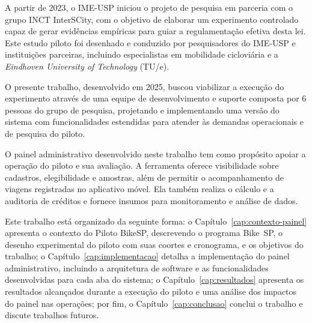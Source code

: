 A partir de 2023, o IME-USP iniciou o projeto de pesquisa em parceria com o
grupo INCT InterSCity, com o objetivo de elaborar um experimento controlado
capaz de gerar evidências empíricas para guiar a regulamentação efetiva desta
lei. Este estudo piloto foi desenhado e conduzido por pesquisadores do IME-USP
e instituições parceiras, incluindo especialistas em mobilidade cicloviária e a
\emph{Eindhoven University of Technology} (TU/e).

O presente trabalho, desenvolvido em 2025, buscou viabilizar a execução do
experimento através de uma equipe de desenvolvimento e
suporte composta por 6 pessoas do grupo de pesquisa, projetando e implementando
uma versão do sistema com funcionalidades estendidas para atender às
demandas operacionais e de pesquisa do piloto.

O painel administrativo desenvolvido neste trabalho tem como propósito apoiar a operação do piloto e sua avaliação. A ferramenta oferece visibilidade sobre cadastros, elegibilidade e amostras, além de permitir o acompanhamento de viagens registradas no aplicativo móvel. Ela também realiza o cálculo e a auditoria de créditos e fornece insumos para monitoramento e análise de dados.

Este trabalho está organizado da seguinte forma: o Capítulo~\ref{cap:contexto-painel} apresenta o contexto do Piloto BikeSP, descrevendo o programa Bike~SP, o desenho experimental do piloto com suas coortes e cronograma, e os objetivos do trabalho; o Capítulo~\ref{cap:implementacao} detalha a implementação do painel administrativo, incluindo a arquitetura de software e as funcionalidades desenvolvidas para cada aba do sistema; o Capítulo~\ref{cap:resultados} apresenta os resultados alcançados durante a execução do piloto e uma análise dos impactos do painel nas operações; por fim, o Capítulo~\ref{cap:conclusao} conclui o trabalho e discute trabalhos futuros.



